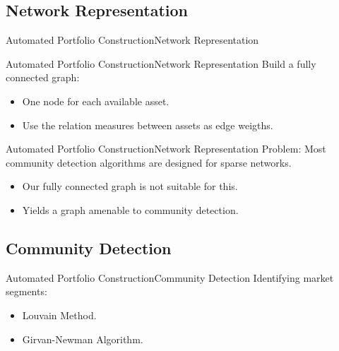 \documentclass[bigger]{beamer}
\begin{document}
\subsection{Network Representation}

\begin{frame}{Automated Portfolio Construction}{Network Representation}
    \bigskip

\end{frame}

\begin{frame}{Automated Portfolio Construction}{Network Representation}
    Build a fully connected graph:
    \begin{itemize}
        \item<2-> One node for each available asset.
        \item<3-> Use the relation measures between assets as edge weigths.
    \end{itemize}
\end{frame}

\begin{frame}{Automated Portfolio Construction}{Network Representation}
    \alert{Problem}: Most community detection algorithms are designed for sparse networks.
    \begin{itemize}
        \item<2-> Our fully connected graph is not suitable for this.
    \end{itemize}
    \bigskip
    \begin{itemize}
        \item<4-> Yields a graph amenable to community detection.
    \end{itemize}
\end{frame}

\subsection{Community Detection}

\begin{frame}{Automated Portfolio Construction}{Community Detection}
    Identifying market segments:
    \begin{itemize}
        \item<2-> Louvain Method.
        \item<3-> Girvan-Newman Algorithm.
    \end{itemize}
\end{frame}
\end{document}
